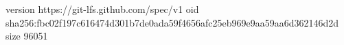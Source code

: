 version https://git-lfs.github.com/spec/v1
oid sha256:fbc02f197c616474d301b7de0ada59f4656afc25eb969e9aa59aa6d362146d2d
size 96051
